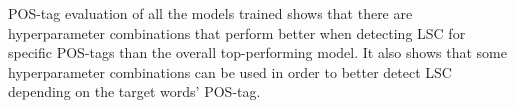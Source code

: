 \bigskip
\bigskip
\bigskip
\bigskip
POS-tag evaluation of all the models trained shows that there are hyperparameter combinations that perform better when detecting LSC for specific POS-tags than the overall top-performing model. It also shows that some hyperparameter combinations can be used in order to better detect LSC depending on the target words’ POS-tag. 
